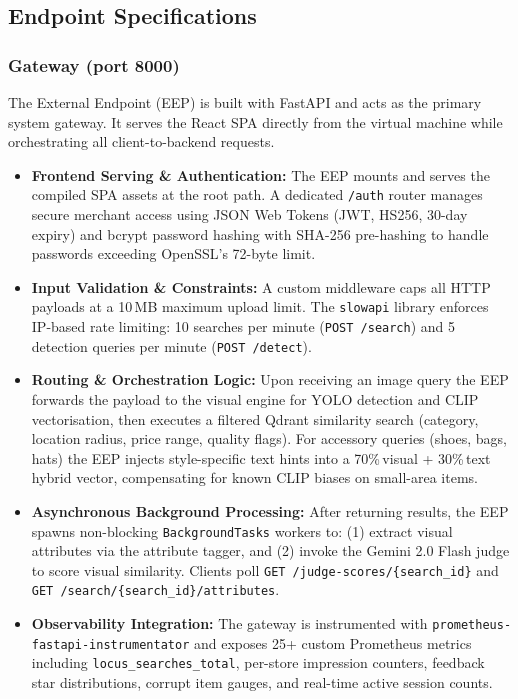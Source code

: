 \documentclass[12pt]{article}
\begin{document}
\subsection{Endpoint Specifications}

\subsubsection{Gateway (port 8000)}

The External Endpoint (EEP) is built with FastAPI and acts as the primary system gateway. It serves the React SPA directly from the virtual machine while orchestrating all client-to-backend requests.

\begin{itemize}[leftmargin=*]
  \item \textbf{Frontend Serving \& Authentication:} The EEP mounts and serves the compiled SPA assets at the root path. A dedicated \texttt{/auth} router manages secure merchant access using JSON Web Tokens (JWT, HS256, 30-day expiry) and bcrypt password hashing with SHA-256 pre-hashing to handle passwords exceeding OpenSSL's 72-byte limit.

  \item \textbf{Input Validation \& Constraints:} A custom middleware caps all HTTP payloads at a 10\,MB maximum upload limit. The \texttt{slowapi} library enforces IP-based rate limiting: 10 searches per minute (\texttt{POST /search}) and 5 detection queries per minute (\texttt{POST /detect}).

  \item \textbf{Routing \& Orchestration Logic:} Upon receiving an image query the EEP forwards the payload to the visual engine for YOLO detection and CLIP vectorisation, then executes a filtered Qdrant similarity search (category, location radius, price range, quality flags). For accessory queries (shoes, bags, hats) the EEP injects style-specific text hints into a 70\%\,visual + 30\%\,text hybrid vector, compensating for known CLIP biases on small-area items.

  \item \textbf{Asynchronous Background Processing:} After returning results, the EEP spawns non-blocking \texttt{BackgroundTasks} workers to: (1) extract visual attributes via the attribute tagger, and (2) invoke the Gemini 2.0 Flash judge to score visual similarity. Clients poll \texttt{GET /judge-scores/\{search\_id\}} and \texttt{GET /search/\{search\_id\}/attributes}.

  \item \textbf{Observability Integration:} The gateway is instrumented with \texttt{prometheus-fastapi-instrumentator} and exposes 25+ custom Prometheus metrics including \texttt{locus\_searches\_total}, per-store impression counters, feedback star distributions, corrupt item gauges, and real-time active session counts.
\end{itemize}
\end{document}
